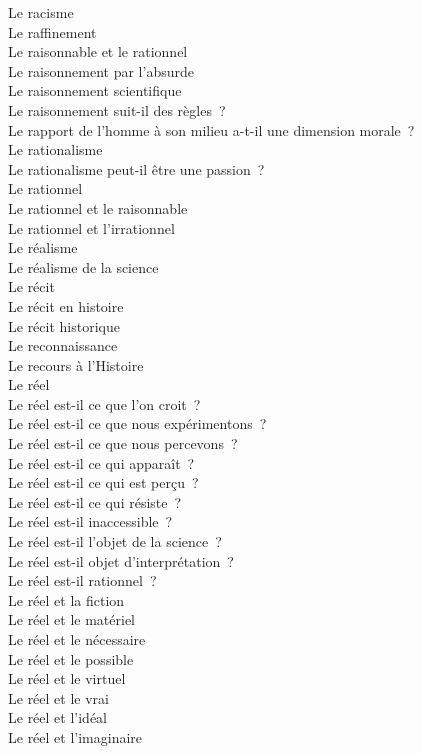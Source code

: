 \documentclass[a4paper,12pt]{article}
\begin{document}
Le racisme \\
Le raffinement \\
Le raisonnable et le rationnel \\
Le raisonnement par l'absurde \\
Le raisonnement scientifique \\
Le raisonnement suit-il des règles ? \\
Le rapport de l'homme à son milieu a-t-il une dimension morale ? \\
Le rationalisme \\
Le rationalisme peut-il être une passion ? \\
Le rationnel \\
Le rationnel et le raisonnable \\
Le rationnel et l'irrationnel \\
Le réalisme \\
Le réalisme de la science \\
Le récit \\
Le récit en histoire \\
Le récit historique \\
Le reconnaissance \\
Le recours à l'Histoire \\
Le réel \\
Le réel est-il ce que l'on croit ? \\
Le réel est-il ce que nous expérimentons ? \\
Le réel est-il ce que nous percevons ? \\
Le réel est-il ce qui apparaît ? \\
Le réel est-il ce qui est perçu ? \\
Le réel est-il ce qui résiste ? \\
Le réel est-il inaccessible ? \\
Le réel est-il l'objet de la science ? \\
Le réel est-il objet d'interprétation ? \\
Le réel est-il rationnel ? \\
Le réel et la fiction \\
Le réel et le matériel \\
Le réel et le nécessaire \\
Le réel et le possible \\
Le réel et le virtuel \\
Le réel et le vrai \\
Le réel et l'idéal \\
Le réel et l'imaginaire \\
\end{document}
